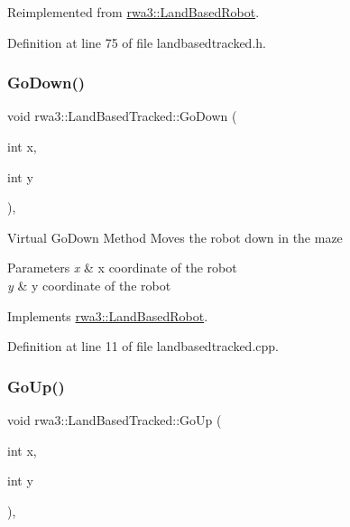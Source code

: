 Reimplemented from \hyperlink{classrwa3_1_1_land_based_robot_a6de17dafe355573275264f74a59f974d}{rwa3\+::\+Land\+Based\+Robot}.



Definition at line 75 of file landbasedtracked.\+h.

\mbox{\label{classrwa3_1_1_land_based_tracked_a1258bb7873abc517913e84e33effd6c4}} 
\subsubsection{\texorpdfstring{Go\+Down()}{GoDown()}}
{\footnotesize\ttfamily void rwa3\+::\+Land\+Based\+Tracked\+::\+Go\+Down (\begin{DoxyParamCaption}\item[{int}]{x,  }\item[{int}]{y }\end{DoxyParamCaption})\hspace{0.3cm}{\ttfamily [override]}, {\ttfamily [virtual]}}

Virtual Go\+Down Method Moves the robot down in the maze 
\begin{DoxyParams}{Parameters}
{\em x} & x coordinate of the robot \\
\hline
{\em y} & y coordinate of the robot \\
\hline
\end{DoxyParams}


Implements \hyperlink{classrwa3_1_1_land_based_robot_a14fcb1b05297131cd09e8a57b8de0578}{rwa3\+::\+Land\+Based\+Robot}.



Definition at line 11 of file landbasedtracked.\+cpp.

\mbox{\label{classrwa3_1_1_land_based_tracked_a36d32a38c1c7cf44c5d7aebeb18f79ff}} 
\subsubsection{\texorpdfstring{Go\+Up()}{GoUp()}}
{\footnotesize\ttfamily void rwa3\+::\+Land\+Based\+Tracked\+::\+Go\+Up (\begin{DoxyParamCaption}\item[{int}]{x,  }\item[{int}]{y }\end{DoxyParamCaption})\hspace{0.3cm}{\ttfamily [override]}, {\ttfamily [virtual]}}

